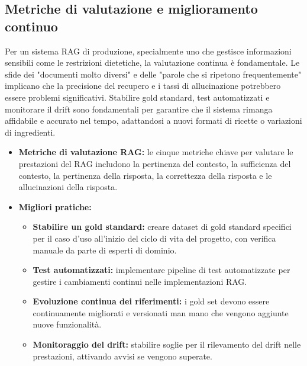 \documentclass[a4paper, 11pt]{article}
\begin{document}
\subsection{Metriche di valutazione e miglioramento continuo}
Per un sistema RAG di produzione, specialmente uno che gestisce informazioni sensibili come le restrizioni dietetiche, la valutazione continua è fondamentale. Le sfide dei "documenti molto diversi" e delle "parole che si ripetono frequentemente" implicano che la precisione del recupero e i tassi di allucinazione \cite{avoiding_hallucinations} potrebbero essere problemi significativi. Stabilire gold standard, test automatizzati e monitorare il drift \cite{rag_evaluation_metrics} sono fondamentali per garantire che il sistema rimanga affidabile e accurato nel tempo, adattandosi a nuovi formati di ricette o variazioni di ingredienti.
\begin{itemize}
    \item \textbf{Metriche di valutazione RAG:} le cinque metriche chiave per valutare le prestazioni del RAG includono la pertinenza del contesto, la sufficienza del contesto, la pertinenza della risposta, la correttezza della risposta e le allucinazioni della risposta. \cite{rag_evaluation_metrics}
    \item \textbf{Migliori pratiche:}
    \begin{itemize}
        \item \textbf{Stabilire un gold standard:} creare dataset di gold standard specifici per il caso d'uso all'inizio del ciclo di vita del progetto, con verifica manuale da parte di esperti di dominio. \cite{rag_evaluation_metrics}
        \item \textbf{Test automatizzati:} implementare pipeline di test automatizzate per gestire i cambiamenti continui nelle implementazioni RAG. \cite{rag_evaluation_metrics}
        \item \textbf{Evoluzione continua dei riferimenti:} i gold set devono essere continuamente migliorati e versionati man mano che vengono aggiunte nuove funzionalità. \cite{rag_evaluation_metrics}
        \item \textbf{Monitoraggio del drift:} stabilire soglie per il rilevamento del drift nelle prestazioni, attivando avvisi se vengono superate. \cite{rag_evaluation_metrics}
    \end{itemize}
\end{itemize}
\end{document}
